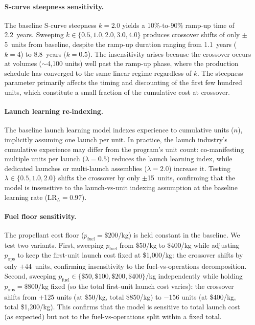 \documentclass[preprint,12pt]{elsarticle}
\begin{document}
\paragraph{S-curve steepness sensitivity.} The baseline S-curve steepness $k = 2.0$ yields a 10\%-to-90\% ramp-up time of 2.2~years. Sweeping $k \in \{0.5, 1.0, 2.0, 3.0, 4.0\}$ produces crossover shifts of only $\pm$5~units from baseline, despite the ramp-up duration ranging from 1.1~years ($k = 4$) to 8.8~years ($k = 0.5$). The insensitivity arises because the crossover occurs at volumes ($\sim$4{,}100 units) well past the ramp-up phase, where the production schedule has converged to the same linear regime regardless of $k$. The steepness parameter primarily affects the timing and discounting of the first few hundred units, which constitute a small fraction of the cumulative cost at crossover.

\paragraph{Launch learning re-indexing.} The baseline launch learning model indexes experience to cumulative units ($n$), implicitly assuming one launch per unit. In practice, the launch industry's cumulative experience may differ from the program's unit count: co-manifesting multiple units per launch ($\lambda = 0.5$) reduces the launch learning index, while dedicated launches or multi-launch assemblies ($\lambda = 2.0$) increase it. Testing $\lambda \in \{0.5, 1.0, 2.0\}$ shifts the crossover by only $\pm$15~units, confirming that the model is insensitive to the launch-vs-unit indexing assumption at the baseline learning rate ($\mathrm{LR}_L = 0.97$).

\paragraph{Fuel floor sensitivity.} The propellant cost floor ($p_{\mathrm{fuel}} = \$200$/kg) is held constant in the baseline. We test two variants. First, sweeping $p_{\mathrm{fuel}}$ from \$50/kg to \$400/kg while adjusting $p_{\mathrm{ops}}$ to keep the first-unit launch cost fixed at \$1{,}000/kg: the crossover shifts by only $\pm$44~units, confirming insensitivity to the fuel-vs-operations decomposition. Second, sweeping $p_{\mathrm{fuel}} \in \{\$50, \$100, \$200, \$400\}$/kg independently while holding $p_{\mathrm{ops}} = \$800$/kg fixed (so the total first-unit launch cost varies): the crossover shifts from $+$125 units (at \$50/kg, total \$850/kg) to $-$156 units (at \$400/kg, total \$1{,}200/kg). This confirms that the model is sensitive to total launch cost (as expected) but not to the fuel-vs-operations split within a fixed total.
\end{document}
